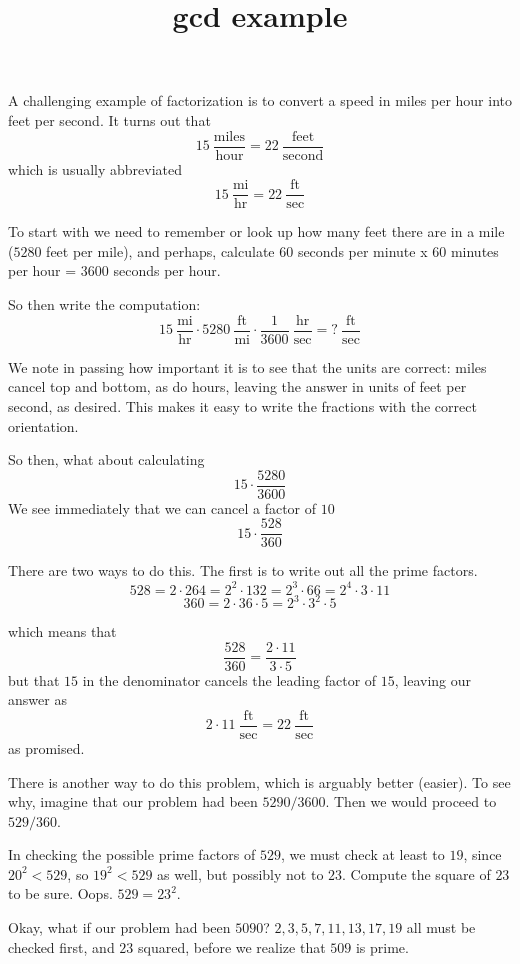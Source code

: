 \documentclass[11pt, oneside]{article}
\title{gcd example}
\date{}
\begin{document}
\maketitle
\Large

A challenging example of factorization is to convert a speed in miles per hour into feet per second.  It turns out that 
\[ 15 \ \frac{\text{miles}}{\text{hour}} = 22 \ \frac{\text{feet}}{\text{second}} \]
which is usually abbreviated
\[ 15 \ \frac{\text{mi}}{\text{hr}} = 22 \ \frac{\text{ft}}{\text{sec}} \]

To start with we need to remember or look up how many feet there are in a mile ($5280$ feet per mile), and perhaps, calculate $60$ seconds per minute x $60$ minutes per hour = $3600$ seconds per hour.

So then write the computation:
\[ 15 \ \frac{\text{mi}}{\text{hr}} \cdot 5280 \ \frac{\text{ft}}{\text{mi}} \cdot \frac{1}{3600} \ \frac{\text{hr}}{\text{sec}} = \text{?} \ \frac{\text{ft}}{\text{sec}} \]

We note in passing how important it is to see that the units are correct:  miles cancel top and bottom, as do hours, leaving the answer in units of feet per second, as desired.  This makes it easy to write the fractions with the correct orientation.

So then, what about calculating
\[ 15 \cdot \frac{5280}{3600} \]
We see immediately that we can cancel a factor of $10$
\[ 15 \cdot \frac{528}{360} \]

There are two ways to do this.  The first is to write out all the prime factors.  
\[ 528 = 2 \cdot 264 = 2^2 \cdot 132 = 2^3 \cdot 66 = 2^4 \cdot 3 \cdot 11 \]
\[ 360 = 2 \cdot 36 \cdot 5 = 2^3 \cdot 3^2 \cdot 5 \]

which means that
\[ \frac{528}{360} = \frac{2 \cdot 11}{3 \cdot 5} \]
but that $15$ in the denominator cancels the leading factor of $15$, leaving our answer as
\[ 2 \cdot 11 \ \frac{\text{ft}}{\text{sec}} = 22 \ \frac{\text{ft}}{\text{sec}}  \]
as promised.

There is another way to do this problem, which is arguably better (easier).  To see why, imagine that our problem had been $5290/3600$.  Then we would proceed to $529/360$.

In checking the possible prime factors of $529$, we must check at least to $19$, since $20^2 < 529$, so $19^2 < 529$ as well, but possibly not to $23$.  Compute the square of $23$ to be sure.  Oops.  $529 = 23^2$.

Okay, what if our problem had been $5090$?   $2, 3, 5, 7, 11, 13, 17, 19$ all must be checked first, and $23$ squared, before we realize that $509$ is prime.
\end{document}
